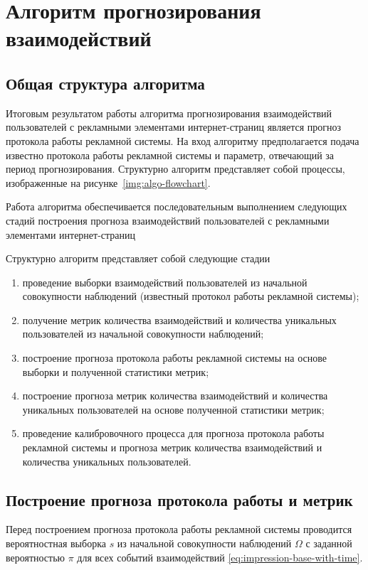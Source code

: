 \section{Алгоритм прогнозирования взаимодействий}
\subsection{Общая структура алгоритма}
Итоговым результатом работы алгоритма прогнозирования взаимодействий пользователей с рекламными элементами
интернет-страниц является прогноз протокола работы рекламной системы. На вход алгоритму предполагается
подача известно протокола работы рекламной системы и параметр, отвечающий за период прогнозирования. 
Структурно алгоритм представляет собой процессы, изображенные на рисунке~\ref{img:algo-flowchart}.


Работа алгоритма обеспечивается последовательным выполнением следующих стадий построения прогноза взаимодействий 
пользователей с рекламными элементами интернет-страниц

Структурно алгоритм представляет собой следующие стадии
\begin{enumerate}
    \item проведение выборки взаимодействий пользователей из начальной совокупности наблюдений (известный протокол
    работы рекламной системы);
    \item получение метрик количества взаимодействий и количества уникальных пользователей из начальной совокупности 
    наблюдений;
    \item построение прогноза протокола работы рекламной системы на основе выборки и полученной статистики метрик;
    \item построение прогноза метрик количества взаимодействий и количества уникальных пользователей на основе 
    полученной статистики метрик;
    \item проведение калибровочного процесса для прогноза протокола работы рекламной системы и прогноза метрик количества
    взаимодействий и количества уникальных пользователей.
\end{enumerate}

\subsection{Построение прогноза протокола работы и метрик}
Перед построением прогноза протокола работы рекламной системы проводится вероятностная выборка $s$ из начальной совокупности 
наблюдений $\Omega$ с заданной вероятностью $\pi$ для всех событий взаимодействий \eqref{eq:impression-base-with-time}.

